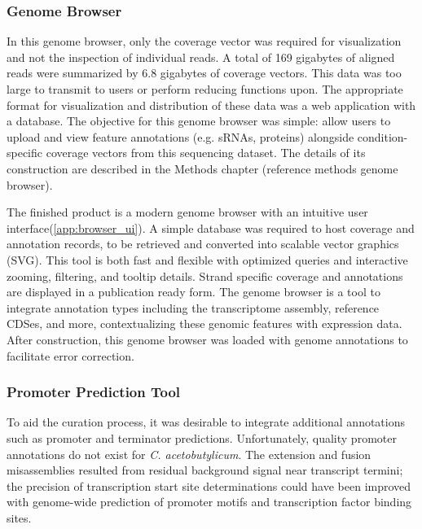\subsubsection{Genome Browser}
In this genome browser, only the coverage vector was required for visualization and not the inspection of individual reads. A total of 169 gigabytes of aligned reads were summarized by 6.8 gigabytes of coverage vectors. This data was too large to transmit to users or perform reducing functions upon. The appropriate format for visualization and distribution of these data was a web application with a database. The objective for this genome browser was simple: allow users to upload and view feature annotations (e.g. sRNAs, proteins) alongside condition-specific coverage vectors from this sequencing dataset. The details of its construction are described in the Methods chapter (reference methods genome browser).

The finished product is a modern genome browser with an intuitive user interface(\ref{app:browser_ui}). A simple database was required to host coverage and annotation records, to be retrieved and converted into scalable vector graphics (SVG). This tool is both fast and flexible with optimized queries and interactive zooming, filtering, and tooltip details. Strand specific coverage and annotations are displayed in a publication ready form. The genome browser is a tool to integrate annotation types including the transcriptome assembly, reference CDSes, and more, contextualizing these genomic features with expression data. After construction, this genome browser was loaded with genome annotations to facilitate error correction.

\subsubsection{Promoter Prediction Tool}
To aid the curation process, it was desirable to integrate additional annotations such as promoter and terminator predictions. Unfortunately, quality promoter annotations do not exist for \textit{C. acetobutylicum}. The extension and fusion misassemblies resulted from residual background signal near transcript termini; the precision of transcription start site determinations could have been improved with genome-wide prediction of promoter motifs and transcription factor binding sites.


